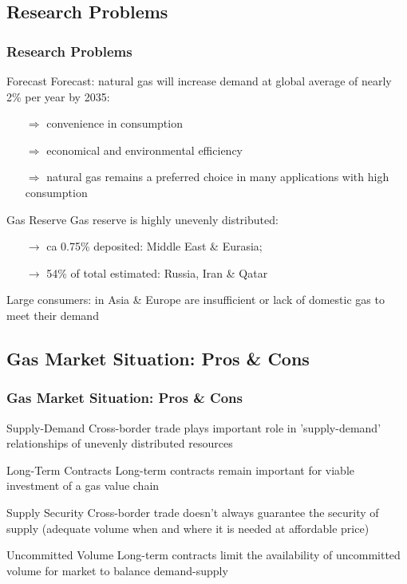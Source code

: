 \documentclass[pdflatex,compress,10pt,
	xcolor={dvipsnames,dvipsnames,svgnames,x11names,table},
	hyperref={
	colorlinks = true,
	breaklinks = true, 
	citecolor=NavyBlue, 
	urlcolor = blue, 
	filecolor=magenta} 
]{beamer}
\begin{document}
\subsection{Research Problems}
\begin{frame}\frametitle{Research Problems}
\small{
\begin{alertblock}{Forecast}
Forecast: natural gas will increase demand at global average of nearly 2\% per year by 2035:
\begin{itemize}
	\item [$\Longrightarrow$] convenience in consumption
	\item [$\Longrightarrow$] economical and environmental efficiency
	\item [$\Longrightarrow$] natural gas remains a preferred choice in many applications with high consumption
\end{itemize}
\end{alertblock}

\begin{block}{Gas Reserve}
Gas reserve is highly unevenly distributed: 
\begin{itemize}
	\item [$\longrightarrow$] ca 0.75\% deposited: Middle East \& Eurasia; 
	\item [$\longrightarrow$]  54\% of total estimated: Russia, Iran \& Qatar
\end{itemize}
\end{block}

\begin{examples}{Large consumers:}
in Asia \& Europe are insufficient or lack of domestic gas to meet their demand
\end{examples}
}
\end{frame}

\subsection{Gas Market Situation: Pros \& Cons}
\begin{frame}\frametitle{Gas Market Situation: Pros \& Cons}
\begin{alertblock}{Supply-Demand}
Cross-border trade plays important role in 'supply-demand' relationships of unevenly distributed resources
\end{alertblock}

\begin{alertblock}{Long-Term Contracts}
Long-term contracts remain important for viable investment of a gas value chain
\end{alertblock}

\begin{block}{Supply Security}
Cross-border trade doesn't always guarantee the security of supply (adequate volume when and where it is needed at affordable price)
\end{block}

\begin{block}{Uncommitted Volume}
Long-term contracts limit the availability of uncommitted volume for market to balance demand-supply
\end{block}
\end{frame}
\end{document}
